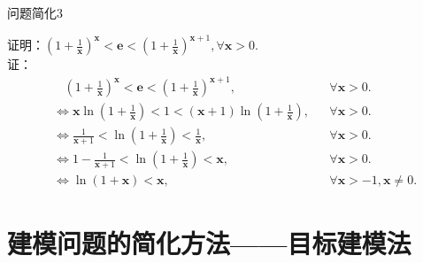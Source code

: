 \documentclass{beamer}
\begin{document}
\begin{frame}{问题简化3}
	\begin{spacing}{1.0}
		$
		\text{证明：}\left( 1+\frac{1}{\boldsymbol{x}} \right) ^{\boldsymbol{x}}<\boldsymbol{e}<\left( 1+\frac{1}{\boldsymbol{x}} \right) ^{\boldsymbol{x}+1},\forall \boldsymbol{x}>0.
		$\\
		证：
	\begin{equation*}
		\begin{aligned}
		&\ \ \ \ \left( 1+\frac{1}{\boldsymbol{x}} \right) ^{\boldsymbol{x}}<\boldsymbol{e}<\left( 1+\frac{1}{\boldsymbol{x}} \right) ^{\boldsymbol{x}+1},&&\forall \boldsymbol{x}>0.\\
		&\Leftrightarrow \boldsymbol{x}\ln \left( 1+\frac{1}{\boldsymbol{x}} \right) <1<\left( \boldsymbol{x}+1 \right) \ln \left( 1+\frac{1}{\boldsymbol{x}} \right),&& \forall \boldsymbol{x}>0.\\
		&\Leftrightarrow \frac{1}{\boldsymbol{x}+1}<\ln \left( 1+\frac{1}{\boldsymbol{x}} \right) <\frac{1}{\boldsymbol{x}},&&\forall \boldsymbol{x}>0.\\
		&\Leftrightarrow 1-\frac{1}{\boldsymbol{x}+1}<\ln \left( 1+\frac{1}{\boldsymbol{x}} \right) <\boldsymbol{x}, &&\forall \boldsymbol{x}>0.\\
		&\Leftrightarrow \ln \left( 1+\boldsymbol{x} \right) <\boldsymbol{x}, &&\forall \boldsymbol{x}>-1,\boldsymbol{x}\ne 0.
		\end{aligned}
	\end{equation*}
	\end{spacing}
\end{frame}


\section{建模问题的简化方法——目标建模法}
\end{document}
